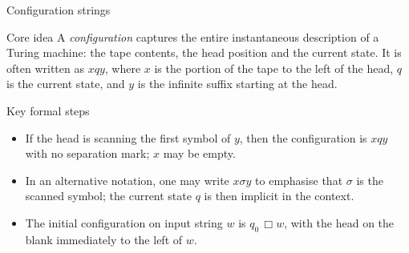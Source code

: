 \begin{frame}[t]{Configuration strings}
  \begin{tblock}{Core idea}
    A \emph{configuration} captures the entire instantaneous description
    of a Turing machine: the tape contents, the head position and the
    current state.  It is often written as $x q y$, where $x$ is the
    portion of the tape to the left of the head, $q$ is the current
    state, and $y$ is the infinite suffix starting at the head.
  \end{tblock}
  \begin{tblock}{Key formal steps}
    \begin{itemize}
      \item If the head is scanning the first symbol of $y$, then the
        configuration is $xqy$ with no separation mark; $x$ may be empty.
      \item In an alternative notation, one may write $x\sigma y$ to
        emphasise that $\sigma$ is the scanned symbol; the current state
        $q$ is then implicit in the context.
      \item The initial configuration on input string $w$ is
        $q_0\,\Box w$, with the head on the blank immediately to the
        left of $w$.
    \end{itemize}
  \end{tblock}
  \label{fr:7.1-11}
\end{frame}

